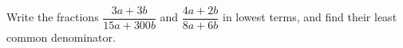 Write the fractions $\dfrac{3a+3b}{15a+300b}$ and $\dfrac{4a+2b}{8a+6b}$ in lowest terms, and find their least common denominator.
